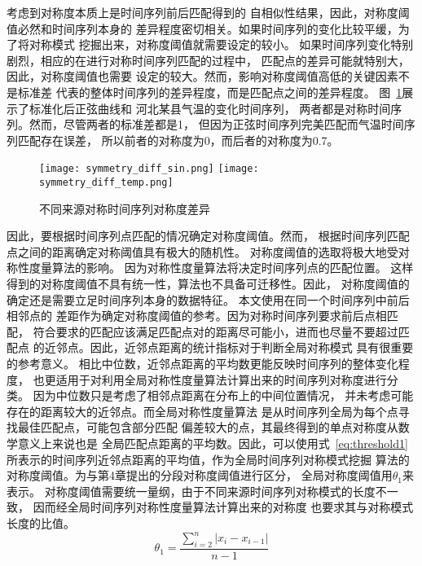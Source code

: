 考虑到对称度本质上是时间序列前后匹配得到的
自相似性结果，因此，对称度阈值必然和时间序列本身的
差异程度密切相关。如果时间序列的变化比较平缓，为了将对称模式
挖掘出来，对称度阈值就需要设定的较小。
如果时间序列变化特别剧烈，相应的在进行对称时间序列匹配的过程中，
匹配点的差异可能就特别大，因此，对称度阈值也需要
设定的较大。然而，影响对称度阈值高低的关键因素不是标准差
代表的整体时间序列的差异程度，而是匹配点之间的差异程度。
图~\ref{fig:symmetry_diff}展示了标准化后正弦曲线和
河北某县气温的变化时间序列，
两者都是对称时间序列。然而，尽管两者的标准差都是1，
但因为正弦时间序列完美匹配而气温时间序列匹配存在误差，
所以前者的对称度为0，而后者的对称度为0.7。
\begin{figure}
  \centering
  {\texttt{[image: symmetry\_diff\_sin.png]}}
  {\texttt{[image: symmetry\_diff\_temp.png]}}
  \caption{不同来源对称时间序列对称度差异}
  \label{fig:symmetry_diff}
\end{figure}

因此，要根据时间序列点匹配的情况确定对称度阈值。然而，
根据时间序列匹配点之间的距离确定对称阈值具有极大的随机性。
对称度阈值的选取将极大地受对称性度量算法的影响。
因为对称性度量算法将决定时间序列点的匹配位置。
这样得到的对称度阈值不具有统一性，算法也不具备可迁移性。因此，
对称度阈值的确定还是需要立足时间序列本身的数据特征。
本文使用在同一个时间序列中前后相邻点的
差距作为确定对称度阈值的参考。因为对称时间序列要求前后点相匹配，
符合要求的匹配应该满足匹配点对的距离尽可能小，进而也尽量不要超过匹配点
的近邻点。因此，近邻点距离的统计指标对于判断全局对称模式
具有很重要的参考意义。
相比中位数，近邻点距离的平均数更能反映时间序列的整体变化程度，
也更适用于对利用全局对称性度量算法计算出来的时间序列对称度进行分类。
因为中位数只是考虑了相邻点距离在分布上的中间位置情况，
并未考虑可能存在的距离较大的近邻点。而全局对称性度量算法
是从时间序列全局为每个点寻找最佳匹配点，可能包含部分匹配
偏差较大的点，其最终得到的单点对称度从数学意义上来说也是
全局匹配点距离的平均数。因此，可以使用式~\ref{eq:threshold1}
所表示的时间序列近邻点距离的平均值，作为全局时间序列对称模式挖掘
算法的对称度阈值。为与第4章提出的分段对称度阈值进行区分，
全局对称度阈值用$\theta_1$来表示。
对称度阈值需要统一量纲，由于不同来源时间序列对称模式的长度不一致，
因而经全局时间序列对称性度量算法计算出来的对称度
也要求其与对称模式长度的比值。
\begin{equation}
  \theta_{1}=\frac{\sum_{i=2}^{n}\left|x_{i}-x_{i-1}\right|}{n-1}
  \label{eq:threshold1}
\end{equation}

